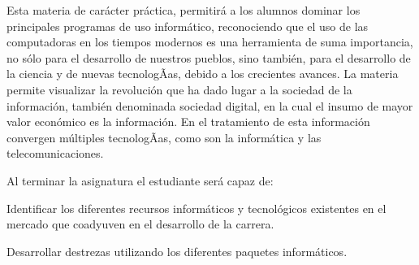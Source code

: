 \begin{syllabus}


\begin{justification}
Esta materia de carácter práctica, permitirá a los alumnos dominar los principales programas de uso informático, reconociendo que el uso de las computadoras en los tiempos modernos es una herramienta de suma importancia, no sólo para el desarrollo de nuestros pueblos, sino también, para el desarrollo de la ciencia y de nuevas tecnologÃ­as, debido a los crecientes avances. La materia permite visualizar la revolución que ha dado lugar a la sociedad de la información, también denominada sociedad digital, en la cual el insumo de mayor valor económico es la información. En el tratamiento de esta información convergen múltiples tecnologÃ­as, como son la informática y las telecomunicaciones. 
\end{justification}

\begin{goals}
Al terminar la asignatura el estudiante será capaz de:

\item Identificar los diferentes recursos informáticos y tecnológicos existentes en el mercado que coadyuven en el desarrollo de la carrera.
\item Desarrollar destrezas utilizando los diferentes paquetes informáticos.
\end{goals}

\begin{outcomes}
\end{outcomes}


\end{syllabus}
